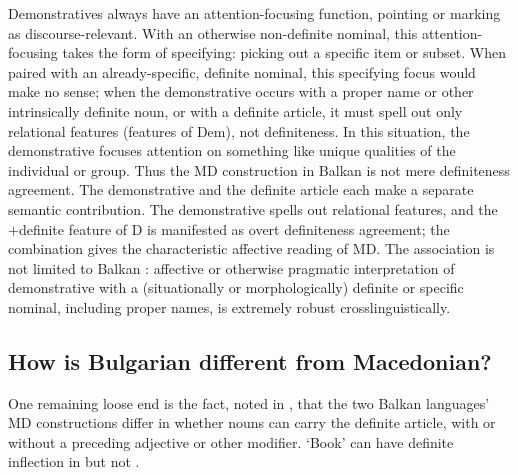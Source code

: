 \documentclass[output=paper,
colorlinks,
citecolor=brown,
newtxmath
]{langscibook}
\begin{document}
\noindent Demonstratives always have an attention-focusing function, pointing or marking as discourse-relevant. With an otherwise non-definite nominal, this attention-focusing takes the form of specifying: picking out a specific item or subset. When paired with an already-specific, definite nominal, this specifying focus would make no sense; when the demonstrative occurs with a proper name or other intrinsically definite noun, or with a definite article, it must spell out only relational features (features of Dem), not definiteness. In this situation, the demonstrative focuses attention on something like unique qualities of the individual or group. Thus the MD construction in Balkan  is not mere definiteness agreement. The demonstrative and the definite article each make a separate semantic contribution. The demonstrative spells out relational features, and the $+$definite feature of D is manifested as overt definiteness agreement; the combination gives the characteristic affective reading of MD. The association is not limited to Balkan : affective or otherwise pragmatic interpretation of demonstrative with a (situationally or morphologically) definite or specific nominal, including proper names, is extremely robust crosslinguistically.

\subsection{How is Bulgarian different from Macedonian?}
One remaining loose end is the fact, noted in , that the two Balkan  languages' MD constructions differ in whether nouns can carry the definite article, with or without a preceding adjective or other modifier. ‘Book’ can have definite inflection in   but not  .
\end{document}
